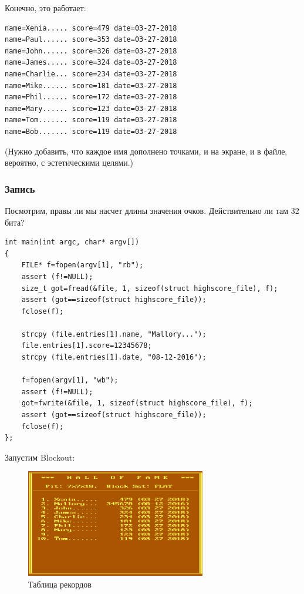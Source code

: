 Конечно, это работает:

\begin{lstlisting}
name=Xenia..... score=479 date=03-27-2018
name=Paul...... score=353 date=03-27-2018
name=John...... score=326 date=03-27-2018
name=James..... score=324 date=03-27-2018
name=Charlie... score=234 date=03-27-2018
name=Mike...... score=181 date=03-27-2018
name=Phil...... score=172 date=03-27-2018
name=Mary...... score=123 date=03-27-2018
name=Tom....... score=119 date=03-27-2018
name=Bob....... score=119 date=03-27-2018
\end{lstlisting}

(Нужно добавить, что каждое имя дополнено точками, и на экране, и в файле, вероятно, с эстетическими целями.)

\subsubsection{Запись}

Посмотрим, правы ли мы насчет длины значения очков. Действительно ли там 32 бита?

\begin{lstlisting}[style=customc]
int main(int argc, char* argv[])
{
	FILE* f=fopen(argv[1], "rb");
	assert (f!=NULL);
	size_t got=fread(&file, 1, sizeof(struct highscore_file), f);
	assert (got==sizeof(struct highscore_file));
	fclose(f);

	strcpy (file.entries[1].name, "Mallory...");
	file.entries[1].score=12345678;
	strcpy (file.entries[1].date, "08-12-2016");

	f=fopen(argv[1], "wb");
	assert (f!=NULL);
	got=fwrite(&file, 1, sizeof(struct highscore_file), f);
	assert (got==sizeof(struct highscore_file));
	fclose(f);
};
\end{lstlisting}

Запустим Blockout:

\begin{figure}[H]
\centering
\includegraphics[width=0.7\textwidth]{advanced/550_more_structs/blockout/hs345678.png}
\caption{Таблица рекордов}
\end{figure}

